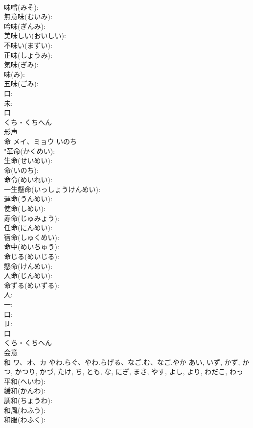 \documentclass[8pt]{extreport}
\begin{document}
\begin{CJK}{UTF8}{min}
\\	味噌(みそ): 
\\	無意味(むいみ): 
\\	吟味(ぎんみ): 
\\	美味しい(おいしい): 
\\	不味い(まずい): 
\\	正味(しょうみ): 
\\	気味(ぎみ): 
\\	味(み): 
\\	五味(ごみ): 
\\	口: 
\\	未: 
\\	口	
\\	くち・くちへん	
\\	形声 
\\	命	メイ、ミョウ	いのち		
\\	"革命(かくめい): 
\\	生命(せいめい): 
\\	命(いのち): 
\\	命令(めいれい): 
\\	一生懸命(いっしょうけんめい): 
\\	運命(うんめい): 
\\	使命(しめい): 
\\	寿命(じゅみょう): 
\\	任命(にんめい): 
\\	宿命(しゅくめい): 
\\	命中(めいちゅう): 
\\	命じる(めいじる): 
\\	懸命(けんめい): 
\\	人命(じんめい): 
\\	命ずる(めいずる): 
\\	人: 
\\	一: 
\\	口: 
\\	卩: 
\\	口	
\\	くち・くちへん	
\\	会意 
\\	和	ワ、オ、カ	やわ.らぐ、やわ.らげる、なご.む、なご.やか	あい, いず, かず, かつ, かつり, かづ, たけ, ち, とも, な, にぎ, まさ, やす, よし, より, わだこ, わっ	
\\	平和(へいわ): 
\\	緩和(かんわ): 
\\	調和(ちょうわ): 
\\	和風(わふう): 
\\	和服(わふく): 

\end{CJK}
\end{document}

